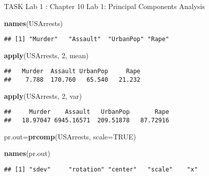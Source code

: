 \documentclass[]{article}
\title{}
\author{}
\date{}
\newenvironment{Shaded}{\begin{snugshade}}{\end{snugshade}}
\newcommand{\DataTypeTok}[1]{\textcolor[rgb]{0.13,0.29,0.53}{#1}}
\newcommand{\DecValTok}[1]{\textcolor[rgb]{0.00,0.00,0.81}{#1}}
\newcommand{\KeywordTok}[1]{\textcolor[rgb]{0.13,0.29,0.53}{\textbf{#1}}}
\newcommand{\NormalTok}[1]{#1}
\newcommand{\OtherTok}[1]{\textcolor[rgb]{0.56,0.35,0.01}{#1}}
\begin{document}
TASK Lab 1 : Chapter 10 Lab 1: Principal Components Analysis

\begin{Shaded}
\begin{Highlighting}[]
\KeywordTok{names}\NormalTok{(USArrests)}
\end{Highlighting}
\end{Shaded}

\begin{verbatim}
## [1] "Murder"   "Assault"  "UrbanPop" "Rape"
\end{verbatim}

\begin{Shaded}
\begin{Highlighting}[]
\KeywordTok{apply}\NormalTok{(USArrests, }\DecValTok{2}\NormalTok{, mean)}
\end{Highlighting}
\end{Shaded}

\begin{verbatim}
##   Murder  Assault UrbanPop     Rape 
##    7.788  170.760   65.540   21.232
\end{verbatim}

\begin{Shaded}
\begin{Highlighting}[]
\KeywordTok{apply}\NormalTok{(USArrests, }\DecValTok{2}\NormalTok{, var)}
\end{Highlighting}
\end{Shaded}

\begin{verbatim}
##     Murder    Assault   UrbanPop       Rape 
##   18.97047 6945.16571  209.51878   87.72916
\end{verbatim}

\begin{Shaded}
\begin{Highlighting}[]
\NormalTok{pr.out=}\KeywordTok{prcomp}\NormalTok{(USArrests, }\DataTypeTok{scale=}\OtherTok{TRUE}\NormalTok{)}
\end{Highlighting}
\end{Shaded}

\begin{Shaded}
\begin{Highlighting}[]
\KeywordTok{names}\NormalTok{(pr.out)}
\end{Highlighting}
\end{Shaded}

\begin{verbatim}
## [1] "sdev"     "rotation" "center"   "scale"    "x"
\end{verbatim}
\end{document}
